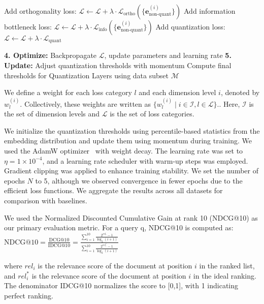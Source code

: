 \begin{algorithm}[H]
\begin{algorithmic}[1]
        \State Add orthogonality loss: $\mathcal{L} \leftarrow \mathcal{L} + \lambda \cdot \mathcal{L}_{\text{ortho}}(\{\mathbf{e}_{\text{non-quant}}^{(i)}\})$
        \State Add information bottleneck loss: $\mathcal{L} \leftarrow \mathcal{L} + \lambda \cdot \mathcal{L}_{\text{info}}(\{\mathbf{e}_{\text{non-quant}}^{(i)}\})$
        \State Add quantization loss: $\mathcal{L} \leftarrow \mathcal{L} + \lambda \cdot \mathcal{L}_{\text{quant}}$
        
        \State \textbf{4. Optimize:} Backpropagate $\mathcal{L}$, update parameters and learning rate
        \State \textbf{5. Update:} Adjust quantization thresholds with momentum
    \EndFor
\EndFor
\State Compute final thresholds for Quantization Layers using data subset
\State \Return $\mathcal{M}$
\end{algorithmic}
\end{algorithm}

We define a weight for each loss category \(l\) and each dimension level \(i\), denoted by \(w_l^{(i)}\). Collectively, these weights are written as $\{ w_l^{(i)} \mid i \in \mathcal{I}, l \in \mathcal{L} \}.$.
Here, \(\mathcal{I}\) is the set of dimension levels and \(\mathcal{L}\) is the set of loss categories.

We initialize the quantization thresholds using percentile-based statistics from the embedding distribution and update them using momentum during training.
We used the AdamW optimizer~\cite{loshchilov2017decoupled} with weight decay. The learning rate was set to $\eta = 1 \times 10^{-4}$, and a learning rate scheduler with warm-up steps was employed. Gradient clipping was applied to enhance training stability.
We set the number of epochs $N$ to 5, although we observed convergence in fewer epochs due to the efficient loss functions. We aggregate the results across all datasets for comparison with baselines.


We used the Normalized Discounted Cumulative Gain at rank 10 (NDCG@10) as our primary evaluation metric. 
For a query q, NDCG@10 is computed as:
$\text{NDCG@10} = \frac{\text{DCG@10}}{\text{IDCG@10}} = \frac{\sum_{i=1}^{10} \frac{2^{rel_i} - 1}{\log_2(i+1)}}{\sum_{i=1}^{10} \frac{2^{rel_i^*} - 1}{\log_2(i+1)}}$

where $rel_i$ is the relevance score of the document at position $i$ in the ranked list, and $rel_i^*$ is the relevance score of the document at position $i$ in the ideal ranking. The denominator IDCG@10 normalizes the score to [0,1], with 1 indicating perfect ranking.


